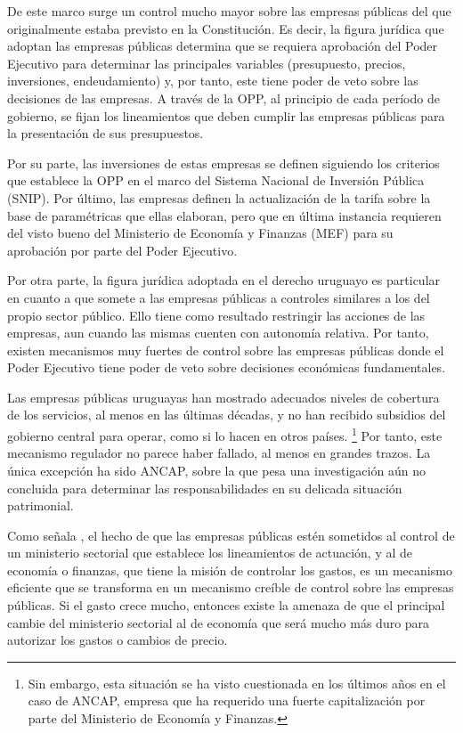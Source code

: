 \documentclass[
  12pt,
  spanish,
]{book}
\begin{document}
De este marco surge un control mucho mayor sobre las empresas públicas del que originalmente estaba previsto en la Constitución. Es decir, la figura jurídica que adoptan las empresas públicas determina que se requiera aprobación del Poder Ejecutivo para determinar las principales variables (presupuesto, precios, inversiones, endeudamiento) y, por tanto, este tiene poder de veto sobre las decisiones de las empresas. A través de la OPP, al principio de cada período de gobierno, se fijan los lineamientos que deben cumplir las empresas públicas para la presentación de sus presupuestos.

Por su parte, las inversiones de estas empresas se definen siguiendo los criterios que establece la OPP en el marco del Sistema Nacional de Inversión Pública (SNIP). Por último, las empresas definen la actualización de la tarifa sobre la base de paramétricas que ellas elaboran, pero que en última instancia requieren del visto bueno del Ministerio de Economía y Finanzas (MEF) para su aprobación por parte del Poder Ejecutivo.

Por otra parte, la figura jurídica adoptada en el derecho uruguayo es particular en cuanto a que somete a las empresas públicas a controles similares a los del propio sector público. Ello tiene como resultado restringir las acciones de las empresas, aun cuando las mismas cuenten con autonomía relativa. Por tanto, existen mecanismos muy fuertes de control sobre las empresas públicas donde el Poder Ejecutivo tiene poder de veto sobre decisiones económicas fundamentales.

Las empresas públicas uruguayas han mostrado adecuados niveles de cobertura de los servicios, al menos en las últimas décadas, y no han recibido subsidios del gobierno central para operar, como si lo hacen en otros países.
\footnote{Sin embargo, esta situación se ha visto cuestionada en los últimos años en el caso de ANCAP, empresa que ha requerido una fuerte capitalización por parte del Ministerio de Economía y Finanzas.}
Por tanto, este mecanismo regulador no parece haber fallado, al menos en grandes trazos. La única excepción ha sido ANCAP, sobre la que pesa una investigación aún no concluida para determinar las responsabilidades en su delicada situación patrimonial.

Como señala \citet{Tirole1994}, el hecho de que las empresas públicas estén sometidos al control de un ministerio sectorial que establece los lineamientos de actuación, y al de economía o finanzas, que tiene la misión de controlar los gastos, es un mecanismo eficiente que se transforma en un mecanismo creíble de control sobre las empresas públicas. Si el gasto crece mucho, entonces existe la amenaza de que el principal cambie del ministerio sectorial al de economía que será mucho más duro para autorizar los gastos o cambios de precio.
\end{document}
